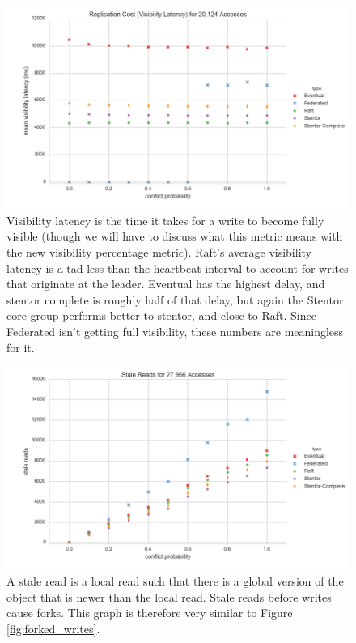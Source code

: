 \documentclass[11pt,letterpaper]{article}
\begin{document}
\begin{figure}[!h]
    \centering
        \includegraphics[width=\textwidth]{figures/visibility_latency.png}
        \caption{\textsf{Visibility latency is the time it takes for a write to become fully visible (though we will have to discuss what this metric means with the new visibility percentage metric). Raft's average visibility latency is a tad less than the heartbeat interval to account for writes that originate at the leader. Eventual has the highest delay, and stentor complete is roughly half of that delay, but again the Stentor core group performs better to stentor, and close to Raft. Since Federated isn't getting full visibility, these numbers are meaningless for it.}}
        \label{fig:visibility_latency}
\end{figure}

\begin{figure}[!h]
    \centering
        \includegraphics[width=\textwidth]{figures/stale_reads.png}
        \caption{\textsf{A stale read is a local read such that there is a global version of the object that is newer than the local read. Stale reads before writes cause forks. This graph is therefore very similar to Figure \ref{fig:forked_writes}.}}
        \label{fig:stale_reads}
\end{figure}
\end{document}

